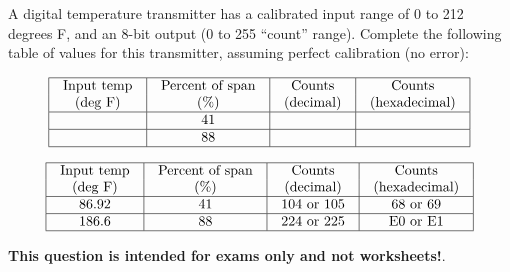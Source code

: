 

A digital temperature transmitter has a calibrated input range of 0 to 212 degrees F, and an 8-bit output (0 to 255 ``count'' range).  Complete the following table of values for this transmitter, assuming perfect calibration (no error):


$$\vbox{\offinterlineskip
\halign{\strut
\vrule \quad\hfil # \ \hfil & 
\vrule \quad\hfil # \ \hfil & 
\vrule \quad\hfil # \ \hfil & 
\vrule \quad\hfil # \ \hfil \vrule \cr
\noalign{\hrule}
%
Input temp & Percent of span & Counts & Counts \cr
%
(deg F) & (\%) & (decimal) & (hexadecimal) \cr
%
\noalign{\hrule}
%
 & 41 &  &  \cr
%
\noalign{\hrule}
%
 & 88 &  &  \cr
%
\noalign{\hrule}
} %
}$$ %








$$\vbox{\offinterlineskip
\halign{\strut
\vrule \quad\hfil # \ \hfil & 
\vrule \quad\hfil # \ \hfil & 
\vrule \quad\hfil # \ \hfil & 
\vrule \quad\hfil # \ \hfil \vrule \cr
\noalign{\hrule}
%
Input temp & Percent of span & Counts & Counts \cr
%
(deg F) & (\%) & (decimal) & (hexadecimal) \cr
%
\noalign{\hrule}
%
86.92 & 41 & 104 or 105 & 68 or 69 \cr
%
\noalign{\hrule}
%
186.6 & 88 & 224 or 225 & E0 or E1 \cr
%
\noalign{\hrule}
} %
}$$ %







{\bf This question is intended for exams only and not worksheets!}.


